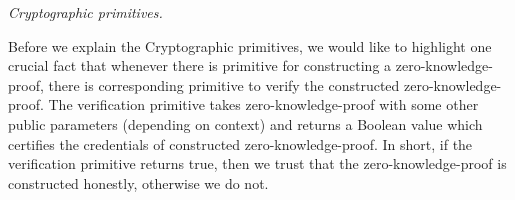 \documentclass{llncs}
\begin{document}
\smallskip\noindent\emph{Cryptographic primitives.}
% 
  
Before we explain the Cryptographic primitives,
we would like to highlight one crucial fact that  whenever 
there is primitive for constructing a zero-knowledge-proof, 
there is corresponding primitive to verify the constructed 
zero-knowledge-proof.
The verification primitive takes zero-knowledge-proof with some 
other public parameters (depending on context) 
and returns a Boolean value which certifies the credentials of constructed 
zero-knowledge-proof. In short, if the verification primitive returns 
true, then we trust that the zero-knowledge-proof is constructed honestly, 
otherwise we do not. 
\end{document}
